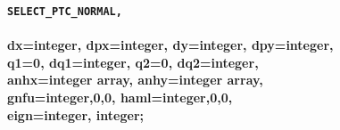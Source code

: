 \begin{description}
	\item[Commands] 

	\item {\texttt{\textbf{\textbf{SELECT\_PTC\_NORMAL, 
\\}}}\\
 \textbf{\textbf{ dx}=integer\textbf{, dpx}=integer\textbf{, dy}=integer\textbf{, dpy}=integer\textbf{,\\
 q1}=0\textbf{, dq1}=integer\textbf{, q2}=0\textbf{, dq2}=integer\textbf{,         
\\         anhx}=integer array, \textbf{anhy}=integer array\textbf{, 
\\         gnfu}=integer,0,0\textbf{, haml}=integer,0,0\textbf{,
\\eign}=integer,          integer\textbf{;}}}


\end{description}
